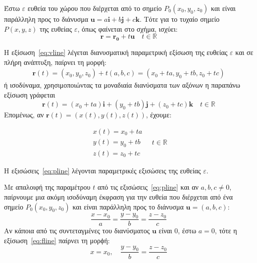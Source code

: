Έστω $ \varepsilon $ ευθεία του χώρου που διέρχεται από το σημείο 
$ P_{0}(x_{0}, y_{0}, z_{0}) $ και είναι παράλληλη προς το διάνυσμα 
$ \mathbf{u} = a \mathbf{i} + b \mathbf{j} + c \mathbf{k} $. Τότε για το 
τυχαίο σημείο $ P(x,y,z) $ της ευθείας $ \varepsilon $, όπως φαίνεται στο σχήμα, ισχύει:
\begin{equation}\label{eq:vline}
  \mathbf{r} = \mathbf{r_{0}} + t \mathbf{u} \quad t \in \mathbb{R}
\end{equation}

Η εξίσωση~\eqref{eq:vline} λέγεται \textcolor{Col1}{διανυσματική παραμετρική} εξίσωση 
της ευθείας $ \varepsilon $  και σε πλήρη ανάπτυξη, παίρνει τη μορφή:
\begin{align*} 
  \mathbf{r}(t) = (x_{0}, y_{0}, z_{0}) + t (a, b, c) 
  = (x_{0} + t a, y_{0}+ t b, z_{0} + t c) 
\end{align*} 
ή ισοδύναμα, χρησιμοποιώντας τα μοναδιαία διανύσματα των αξόνων η παραπάνω εξίσωση
γράφεται
\[
  \boxed{\mathbf{r}(t) = (x_{0}+ t a) \mathbf{i} + (y_{0} + t b) \mathbf{j}+
  (z_{0}+ t c) \mathbf{k}} \quad t \in \mathbb{R} 
\]
Επομένως, αν $ \mathbf{r}(t) = (x(t), y(t), z(t)) $, έχουμε:

\begin{equation}\label{eq:pline}
  \boxed{
    \begin{matrix}
      x(t) = x_{0} + t a \\
      y(t) = y_{0} + t b \\
      z(t) = z_{0} + t c
    \end{matrix}
  } 
  \quad t \in \mathbb{R} 
\end{equation} 

Η εξισώσεις~\eqref{eq:pline} λέγονται \textcolor{Col1}{παραμετρικές εξισώσεις} της 
ευθείας $ \varepsilon $.

\begin{rem}
  Με απαλοιφή της παραμέτρου $t$ από τις εξισώσεις~\eqref{eq:pline} και αν 
  $ a, b, c \neq 0 $, παίρνουμε μια ακόμη ισοδύναμη έκφραση για την ευθεία που 
  διέρχεται από ένα σημείο $ P_{0}(x_{0}, y_{0}, z_{0}) $ και είναι παράλληλη προς το 
  διάνυσμα $ \mathbf{u} = (a,b,c) $:
  \begin{equation}\label{eq:fline}
    \boxed{\frac{x- x_{0}}{a} = \frac{y- y_{0}}{b} = \frac{z- z_{0}}{c}}
  \end{equation}
  Αν κάποια από τις συντεταγμένες του διανύσματος $ \mathbf{u} $ είναι 0, έστω $ a=0 $,
  τότε η εξίσωση~\eqref{eq:fline} παίρνει τη μορϕή:
  \[
    x = x_{0}, \quad \frac{y- y_{0}}{b} = \frac{z- z_{0}}{c}
  \]
\end{rem}


